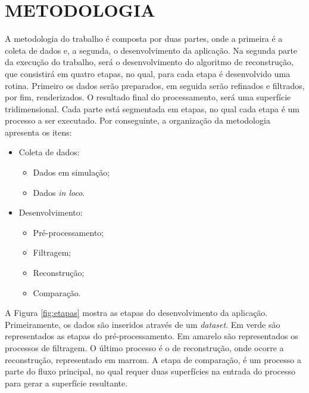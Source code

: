 
\chapter{METODOLOGIA}
\label{chap:metodologia}

A metodologia do trabalho é composta por duas partes, onde a primeira é a coleta de dados e, a segunda, o desenvolvimento da aplicação. 
Na segunda parte da execução do trabalho, será o desenvolvimento do algoritmo de reconstrução, que consistirá em quatro etapas, no qual, para cada etapa é desenvolvido uma rotina. 
Primeiro os dados serão preparados, em seguida serão refinados e filtrados, por fim, renderizados.
O resultado final do processamento, será uma superfície tridimensional.
Cada parte está segmentada em etapas, no qual cada etapa é um processo a ser executado. Por conseguinte, a organização da metodologia apresenta os itens:

\begin{itemize}
    \addtolength{\itemindent}{2em}
    
    \item Coleta de dados:
    \begin{itemize}
        \addtolength{\itemindent}{2em}
        
        \item Dados em simulação;
        \item Dados \textit{in loco}.
    \end{itemize}
    
    \item Desenvolvimento:
    \begin{itemize}
        \addtolength{\itemindent}{2em}
        
        \item Pré-processamento;
        \item Filtragem;
        \item Reconstrução;
        \item Comparação.
    \end{itemize}
\end{itemize}
\hspace{1em}

A Figura \ref{fig:etapas} mostra as etapas do desenvolvimento da aplicação. Primeiramente, os dados são inseridos através de um \textit{dataset}. 
Em verde são representados as etapas do pré-processamento.
Em amarelo são representados os processos de filtragem.
O último processo é o de reconstrução, onde ocorre a reconstrução, representado em marrom.
A etapa de comparação, é um processo a parte do fluxo principal, no qual requer duas superfícies na entrada do processo para gerar a superfície resultante.


